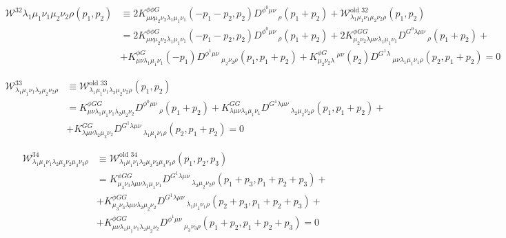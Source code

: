 \documentclass[11pt, oneside]{article}   	%
\newcommand{\W}{\mathcal{W}}
\begin{document}
\begin{equation} \begin{split} \W^{32}{\lambda_1 \mu_1 \nu_ 1 \mu_2 \nu_2 \rho} (p_1, p_2 )&\equiv 2 K^{\phi \phi G}_{\mu\nu \mu_2 \nu_2 \lambda_1 \mu_1 \nu_1} (-p_1 - p_2,p_2) D^{\phi^{0} \mu\nu}\,_{\rho} (p_1 + p_2) + \W^{\text{old }32}_{\lambda_1 \mu_1 \nu_ 1 \mu_2 \nu_2 \rho} (p_1 , p_2 ) \\ &= 2 K^{\phi \phi G}_{\mu\nu \mu_2 \nu_2 \lambda_1 \mu_1 \nu_1} (-p_1 - p_2,p_2) D^{\phi^{0} \mu\nu}\,_{\rho} (p_1 + p_2) +  2K^{\phi G G}_{\mu_2 \nu_2 \lambda \mu \nu \lambda_1 \mu_1 \nu_1} D^{G^{0} \lambda \mu \nu}\,_{\rho} (p_1 + p_2 ) + \\ &+K^{\phi G}_{\mu \nu \lambda_1 \mu_1 \nu_1 } (-p_1 ) D^{\phi^{1} \mu \nu}\,_{\mu_2 \nu_2 \rho} (p_1 , p_1 + p_2 ) + K^{\phi G}_{\mu_2 \nu_2 \lambda}\,^{\mu\nu}(p_2 )D^{G^{1} \lambda}\,_{\mu\nu\lambda_1 \mu_1 \nu_1 \rho} (p_2 , p_1 + p_2 ) = 0\end{split}  \end{equation}

\begin{equation} \begin{split} \W^{33}_{\lambda_1 \mu_1 \nu_ 1 \lambda_2 \mu_2 \nu_2 \rho} &\equiv \W^{\text{old }33}_{\lambda_1 \mu_1 \nu_ 1 \lambda_2 \mu_2 \nu_2 \rho} (p_1 , p_2 ) \\ &= K^{\phi G G}_{\mu \nu \lambda_1 \mu_1 \nu_1 \lambda_2 \mu_2 \nu_2} D^{\phi^{0} \mu \nu}\,_{\rho} (p_1 + p_2 ) + K^{GG}_{\lambda \mu \nu \lambda_1 \mu_1 \nu_1 } D^{G^{1} \lambda \mu \nu}\,_{\lambda_2\mu_2 \nu_2 \rho} (p_1 , p_1 + p_2 ) + \\ &+ K^{GG}_{\lambda \mu\nu \lambda_2 \mu_2 \nu_2}D^{G^{1}\lambda \mu \nu}\,_{\lambda_1 \mu_1 \nu_1 \rho} (p_2 , p_1 + p_2 ) = 0 \end{split}  \end{equation}

\begin{equation}  \begin{split} \W^{34}_{\lambda_1 \mu_1 \nu_ 1 \lambda_2 \mu_2 \nu_2 \mu_3 \nu_3 \rho} &\equiv \W^{\text{old }34}_{\lambda_1 \mu_1 \nu_ 1 \lambda_2 \mu_2 \nu_2 \mu_3 \nu_3 \rho} (p_1 , p_2 , p_3 ) \\ &= K^{\phi G G}_{\mu_3 \nu_3 \lambda \mu \nu \lambda_1 \mu_1 \nu_1} D^{G^{1} \lambda \mu \nu}\,_{\lambda_2 \mu_2 \nu_2 \rho} (p_1 + p_3 , p_1 +p_2 + p_3 ) +\\ &+ K^{\phi G G}_{\mu_3 \nu_3 \lambda \mu \nu \lambda_2 \mu_2 \nu_2} D^{G^{1} \lambda \mu \nu}\,_{\lambda_1 \mu_1 \nu_1 \rho} (p_2 + p_3 , p_1 +p_2 + p_3 ) + \\ &+ K^{\phi G G}_{\mu \nu \lambda_1 \mu_1 \nu_1 \lambda_2 \mu_2 \nu_2} D^{\phi^{1}\mu \nu}\,_{\mu_3 \nu_3 \rho} (p_1 + p_2 , p_1 +p_2 + p_3 ) = 0\end{split}  \end{equation}
\end{document}
